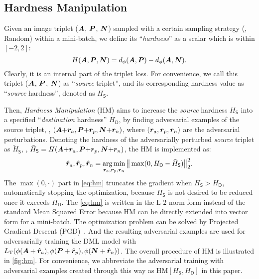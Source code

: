 \documentclass[10pt,twocolumn,letterpaper]{article}
\begin{document}
\subsection{Hardness Manipulation}
\label{sec:31}


Given an image triplet (${\bm{A}}$, ${\bm{P}}$, ${\bm{N}}$) sampled with a certain sampling
strategy (\eg, Random) within a mini-batch, we define its ``\emph{hardness}''
as a scalar which is within $[-2,2]$:
%
\begin{equation}
%
H(\mA,\mP,\mN)=d_\phi(\mA,\mP)-d_\phi(\mA,\mN).
%
\end{equation}
%
Clearly, it is an internal part of the triplet loss.
%
For convenience, we call this triplet (${\bm{A}}$, ${\bm{P}}$, ${\bm{N}}$) as ``\emph{source}
triplet'', and its corresponding hardness value as ``\emph{source} hardness'',
denoted as $H_\mathsf{S}$.


Then, \emph{Hardness Manipulation} (HM) aims to increase the \emph{source}
hardness $H_\mathsf{S}$ into a specified ``\emph{destination} hardness''
$H_\mathsf{D}$, by finding adversarial examples of the source triplet, \ie,
$({\bm{A}}{+} {{\bm{r}}}_a, {\bm{P}} {+} {{\bm{r}}}_p, {\bm{N}} {+} {{\bm{r}}}_n)$, where $({{\bm{r}}}_a, {{\bm{r}}}_p,
{{\bm{r}}}_n)$ are the adversarial perturbations.
%
Denoting the hardness of the adversarially perturbed \emph{source} triplet
as $\tilde{H}_\mathsf{S}$, \ie,
%
$\tilde{H}_\mathsf{S} = H({\bm{A}}{+} {{\bm{r}}}_a, {\bm{P}} {+} {{\bm{r}}}_p, {\bm{N}} {+} {{\bm{r}}}_n)$,
%
the HM is implemented as:
%
\begin{equation}
	\hat{{\bm{r}}}_a, \hat{{\bm{r}}}_p, \hat{{\bm{r}}}_n = \operatorname*{arg\,min}_{{\bm{r}}_a,{\bm{r}}_p,{\bm{r}}_n}
	\big\|\max(0, H_\mathsf{D} - \tilde{H}_\mathsf{S} ) \big\|_2^2.
	\label{eq:hm}
\end{equation}
%
The $\max(0,\cdot)$ part in \cref{eq:hm} truncates the gradient when
$H_\mathsf{S}>H_\mathsf{D}$, automatically stopping the optimization, because
$H_\mathsf{S}$ is not desired to be reduced once it exceeds $H_\mathsf{D}$.
%
The \cref{eq:hm} is written in the L-$2$ norm form instead of the standard Mean
Squared Error because HM can be directly extended into vector form for a
mini-batch.
%
The optimization problem can be solved by Projected Gradient Descent
(PGD)~\cite{madry}.
%
And the resulting adversarial examples are used for adversarially training the
DML model with
%
$L_\text{T}(\phi({\bm{A}}+\hat{{\bm{r}}}_a), \phi({\bm{P}}+\hat{{\bm{r}}}_p),
\phi({\bm{N}}+\hat{{\bm{r}}}_n))$.
%
The overall procedure of HM is illustrated in \cref{fig:hm}.
%
For convenience,
we abbreviate the adversarial training with adversarial examples created
through this way as $\text{HM}[H_\mathsf{S},H_\mathsf{D}]$ in this paper.
\end{document}
